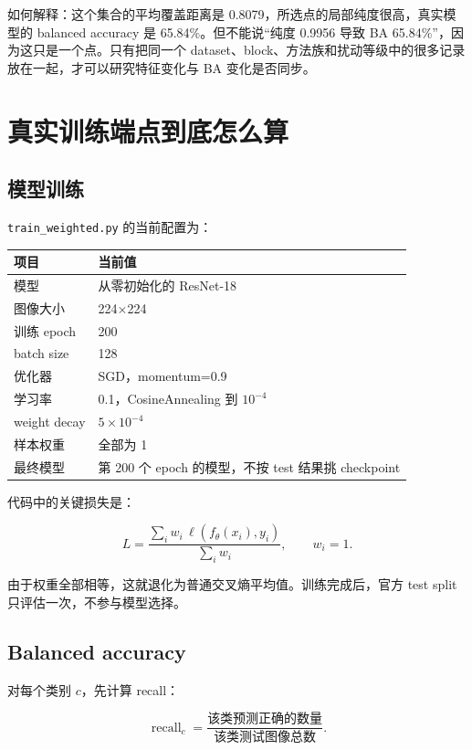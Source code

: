 \documentclass[UTF8,a4paper,12pt]{ctexart}
\newcommand{\code}[1]{\texttt{#1}}
\begin{document}
如何解释：这个集合的平均覆盖距离是 0.8079，所选点的局部纯度很高，真实模型的 balanced accuracy 是 65.84\%。但不能说“纯度 0.9956 导致 BA 65.84\%”，因为这只是一个点。只有把同一个 dataset、block、方法族和扰动等级中的很多记录放在一起，才可以研究特征变化与 BA 变化是否同步。

\section{真实训练端点到底怎么算}

\subsection{模型训练}

\code{train\_weighted.py} 的当前配置为：

\begin{center}
\begin{tabular}{ll}
\toprule
项目 & 当前值 \\
\midrule
模型 & 从零初始化的 ResNet-18 \\
图像大小 & 224\(\times\)224 \\
训练 epoch & 200 \\
batch size & 128 \\
优化器 & SGD，momentum=0.9 \\
学习率 & 0.1，CosineAnnealing 到 \(10^{-4}\) \\
weight decay & \(5\times10^{-4}\) \\
样本权重 & 全部为 1 \\
最终模型 & 第 200 个 epoch 的模型，不按 test 结果挑 checkpoint \\
\bottomrule
\end{tabular}
\end{center}

代码中的关键损失是：

\[
L=\frac{\sum_i w_i\,\ell(f_\theta(x_i),y_i)}{\sum_i w_i},
\qquad w_i=1.
\]

由于权重全部相等，这就退化为普通交叉熵平均值。训练完成后，官方 test split 只评估一次，不参与模型选择。

\subsection{Balanced accuracy}

对每个类别 \(c\)，先计算 recall：

\[
\operatorname{recall}_c=
\frac{\text{该类预测正确的数量}}{\text{该类测试图像总数}}.
\]
\end{document}
